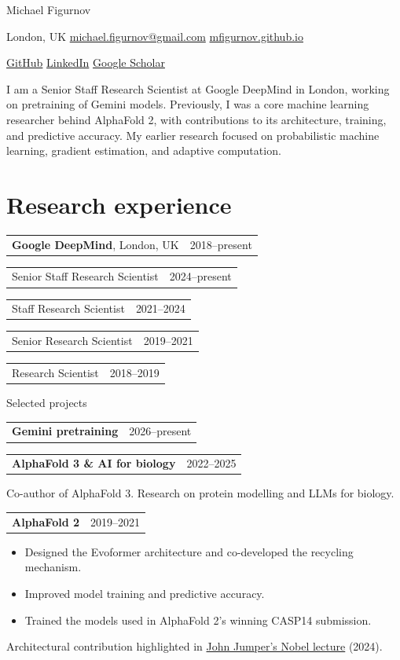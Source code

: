 \documentclass[10pt,a4paper]{article}
\makeatletter
\newcommand{\dated}[2]{\par\begin{tabularx}{\linewidth}{@{}Xr@{}}#1 & {\small\color{muted}#2}\end{tabularx}\par}
\makeatother
\begin{document}
\fontsize{10.4pt}{12.6pt}\selectfont
\color{ink}

{\fontsize{29pt}{32pt}\selectfont\rmfamily Michael Figurnov}\par
\vspace{3pt}
{\small London, UK \quad\textbar\quad
\href{mailto:michael.figurnov@gmail.com}{michael.figurnov@gmail.com} \quad\textbar\quad
\href{https://mfigurnov.github.io/}{mfigurnov.github.io}\par}
{\small
\href{https://github.com/mfigurnov/}{GitHub} \quad\textbar\quad
\href{https://www.linkedin.com/in/michael-figurnov-9978b741/}{LinkedIn} \quad\textbar\quad
\href{https://scholar.google.com/citations?user=qd0tOpQAAAAJ}{Google Scholar}\par}
\vspace{5pt}

{\raggedright
I am a Senior Staff Research Scientist at Google DeepMind in London, working on
pretraining of Gemini models. Previously, I was a core machine learning researcher
behind AlphaFold 2, with contributions to its architecture, training, and predictive
accuracy. My earlier research focused on probabilistic machine learning, gradient
estimation, and adaptive computation.\par}

\section*{Research experience}
\dated{\textbf{Google DeepMind}, London, UK}{2018--present}
\dated{Senior Staff Research Scientist}{2024--present}
\dated{Staff Research Scientist}{2021--2024}
\dated{Senior Research Scientist}{2019--2021}
\dated{Research Scientist}{2018--2019}

\vspace{4pt}
{\small\color{muted}Selected projects\par}
\vspace{2pt}
\dated{\textbf{Gemini pretraining}}{2026--present}
\vspace{3pt}
\dated{\textbf{AlphaFold 3 \& AI for biology}}{2022--2025}
Co-author of AlphaFold 3. Research on protein modelling and LLMs for biology.
\dated{\textbf{AlphaFold 2}}{2019--2021}
\begin{itemize}
  \item Designed the Evoformer architecture and co-developed the recycling mechanism.
  \item Improved model training and predictive accuracy.
  \item Trained the models used in AlphaFold 2's winning CASP14 submission.
\end{itemize}
{\small Architectural contribution highlighted in
\href{https://www.youtube.com/watch?v=qX1aYUckvnY\&t=1183s}{John Jumper's Nobel lecture} (2024).\par}
\end{document}
